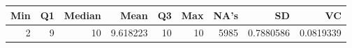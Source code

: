 
\begin{tabular}[t]{rrrrrrrrr}
\toprule
Min & Q1 & Median & Mean & Q3 & Max & NA's & SD & VC\\
\midrule
2 & 9 & 10 & 9.618223 & 10 & 10 & 5985 & 0.7880586 & 0.0819339\\
\bottomrule
\end{tabular}